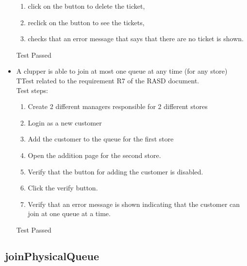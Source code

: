 \begin{itemize}
\begin{enumerate}
        \item click on the button to delete the ticket,

        \item reclick on the button to see the tickets,

        \item checks that an error message that says that there are no ticket is shown.
    \end{enumerate}
    Test Passed

    \item A clupper is able to join at most one queue at any time (for any store)\\
    TTest related to the requirement R7 of the RASD document.\\
    Test steps:\\
    \begin{enumerate}
        \item Create 2 different managers responsible for 2 different stores
        \item Login as a new customer
        \item Add the customer to the queue for the first store
        \item Open the addition page for the second store.
        \item Verify that the button for adding the customer is disabled.
        \item Click the verify button.
        \item Verify that an error message is shown indicating that the customer can join at one queue at a time.
    \end{enumerate}
    Test Passed
\end{itemize}

\subsection{joinPhysicalQueue}

